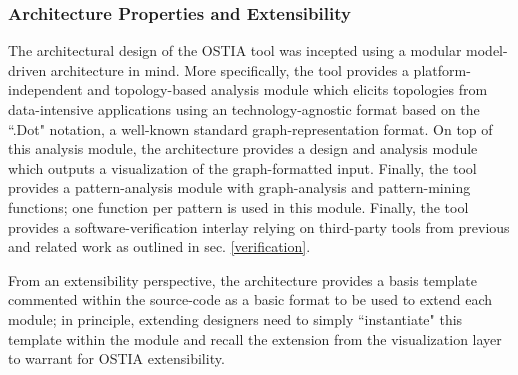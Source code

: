 {\color{blue}
\subsubsection{Architecture Properties and Extensibility}

The architectural design of the OSTIA tool was incepted using a modular model-driven architecture \cite{mda} in mind. More specifically, the tool provides a platform-independent and topology-based analysis module which elicits topologies from data-intensive applications using an technology-agnostic format based on the ``.Dot" notation, a well-known standard graph-representation format. On top of this analysis module, the architecture provides a design and analysis module which outputs a visualization of the graph-formatted input. Finally, the tool provides a pattern-analysis module with graph-analysis and pattern-mining functions; one function per pattern is used in this module. Finally, the tool provides a software-verification interlay relying on third-party tools from previous and related work as outlined in sec. \ref{verification}.

From an extensibility perspective, the architecture provides a basis template commented within the source-code as a basic format to be used to extend each module; in principle, extending designers need to simply ``instantiate" this template within the module and recall the extension from the visualization layer to warrant for OSTIA extensibility.

}
